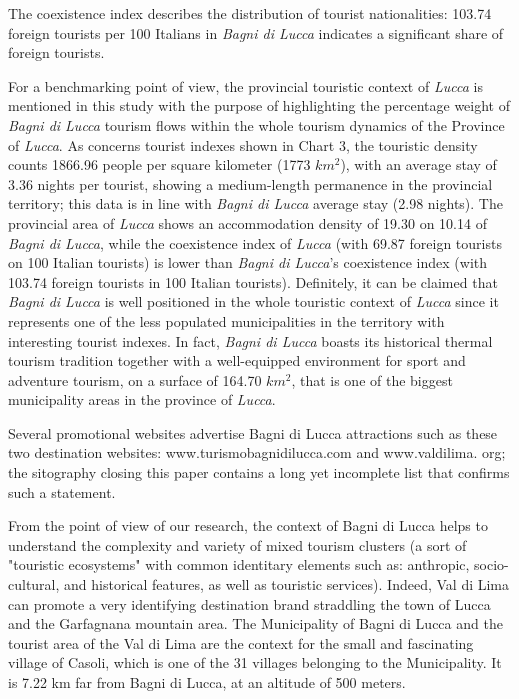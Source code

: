 \documentclass[sustainability,article,submit,pdftex,moreauthors]{Definitions/mdpi}
\begin{document}
The coexistence index describes the distribution of tourist nationalities: 103.74 foreign tourists per 100 Italians in \emph{Bagni di Lucca} indicates a significant share of foreign tourists.

For a benchmarking point of view, the provincial touristic context of \emph{Lucca} is mentioned in this study with the purpose of highlighting the percentage weight of \emph{Bagni di Lucca} tourism flows within the whole tourism dynamics of the Province of \emph{Lucca}. 
As concerns tourist indexes shown in Chart 3, the touristic density counts 1866.96 people per square kilometer (1773 $km^2$), with an average stay of 3.36 nights per tourist, showing a medium-length permanence in the provincial territory; this data is in line with \emph{Bagni di Lucca} average stay (2.98 nights). 
The provincial area of \emph{Lucca} shows an accommodation density of 19.30 on 10.14 of \emph{Bagni di Lucca}, while the coexistence index of \emph{Lucca} (with 69.87 foreign tourists on 100 Italian tourists) is lower than \emph{Bagni di Lucca}’s coexistence index (with 103.74 foreign tourists in 100 Italian tourists). 
Definitely, it can be claimed that \emph{Bagni di Lucca} is well positioned in the whole touristic context of \emph{Lucca} since it represents one of the less populated municipalities in the territory with interesting tourist indexes. In fact, \emph{Bagni di Lucca} boasts its historical thermal tourism tradition together with a well-equipped environment for sport and adventure tourism, on a surface of 164.70 $km^2$, that is one of the biggest municipality areas in the province of \emph{Lucca}.

Several promotional websites advertise Bagni di Lucca attractions such as these two destination websites: www.turismobagnidilucca.com and www.valdilima. org; the sitography closing this paper contains a long yet incomplete list that confirms such a statement.

From the point of view of our research, the context of Bagni di Lucca helps to understand the complexity and variety of mixed tourism clusters (a sort of "touristic ecosystems" with common identitary elements such as: anthropic, socio-cultural, and historical features, as well as touristic services). Indeed, Val di Lima can promote a very identifying destination brand straddling the town of Lucca and the Garfagnana mountain area. The Municipality of Bagni di Lucca and the tourist area of the Val di Lima are the context for the small and fascinating village of Casoli, which is one of the 31 villages belonging to the Municipality. It is 7.22 km far from Bagni di Lucca, at an altitude of 500 meters.
\end{document}

